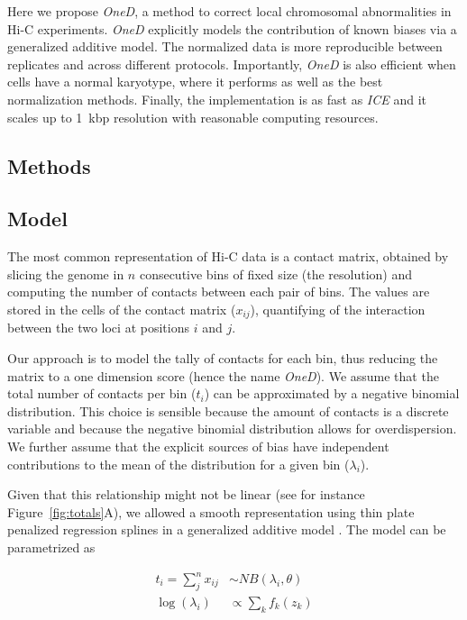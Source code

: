 \documentclass{bioinfo}
\begin{document}
Here we propose \textit{OneD}, a method to correct local chromosomal
abnormalities in Hi-C experiments. \textit{OneD} explicitly models the
contribution of known biases via a generalized additive model. The
normalized data is more reproducible between replicates and across
different protocols. Importantly, \textit{OneD} is also efficient when
cells have a normal karyotype, where it performs as well as the best
normalization methods. Finally, the implementation is as fast as
\textit{ICE} and it scales up to 1~kbp resolution with reasonable
computing resources.


\begin{methods}

\section{Methods}

\subsection{Model}
\label{sec:model}

The most common representation of Hi-C data is a contact matrix, obtained
by slicing the genome in $n$ consecutive bins of fixed size (the
resolution) and computing the number of contacts between each pair of
bins. The values are stored in the cells of the contact matrix ($x_{ij}$),
quantifying of the interaction between the two loci at positions $i$ and
$j$.

Our approach is to model the tally of contacts for each bin, thus reducing
the matrix to a one dimension score (hence the name \textit{OneD}). We assume that
the total number of contacts per bin ($t_{i}$) can be approximated by a
negative binomial distribution. This choice is sensible because the amount
of contacts is a discrete variable and because the negative binomial
distribution allows for overdispersion. We further assume that the
explicit sources of bias have independent contributions to the mean of the
distribution for a given bin ($\lambda_i$).

Given that this relationship might not be linear (see for instance
Figure~\ref{fig:totals}A), we allowed a smooth representation
using thin plate penalized regression splines \citep{wood2003thin} in a
generalized additive model \citep{wood2011fast}. The model can be
parametrized as

\begin{align*}
t_i = \sum_j^n{x_{ij}} &\sim  NB(\lambda_i, \theta) \\
\log(\lambda_i) &\propto \sum_{k}{f_k(z_k)}
\end{align*}


\end{methods}
\end{document}
